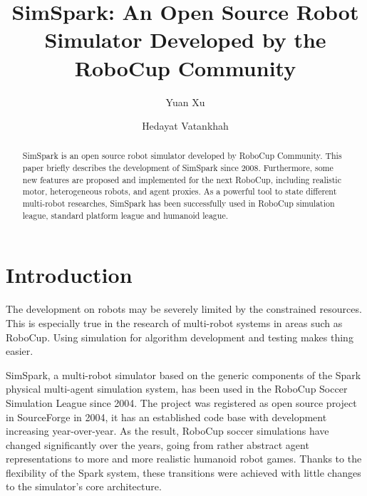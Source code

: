 \documentclass{llncs}
\begin{document}
\title{SimSpark: An Open Source Robot Simulator Developed by the RoboCup Community}

\author{Yuan Xu \and Hedayat Vatankhah}


\maketitle

\begin{abstract}
  SimSpark is an open source robot simulator developed by RoboCup Community.
  This paper briefly describes the development of SimSpark since 2008.
  Furthermore, some new features are proposed and implemented for the next RoboCup, including realistic motor, heterogeneous robots, and agent proxies.
  As a powerful tool to state different multi-robot researches, SimSpark has been successfully used in RoboCup simulation league, standard platform league and humanoid league.
\end{abstract}

\section{Introduction}
The development on robots may be severely limited by the constrained resources.
This is especially true in the research of multi-robot systems in areas such as RoboCup.
Using simulation for algorithm development and testing makes thing easier.

SimSpark, a multi-robot simulator based on the generic components of the Spark\cite{OR05} physical multi-agent simulation system, has been used in the RoboCup Soccer Simulation League since 2004.
The project was registered as open source project in SourceForge in 2004, it has an established code base with development increasing year-over-year.
As the result, RoboCup soccer simulations have changed significantly over the years, going from rather abstract agent representations to more and more realistic humanoid robot games\cite{Boedecker2008,usermanual}.
Thanks to the flexibility of the Spark system, these transitions were achieved with little changes to the simulator's core architecture.
\end{document}
